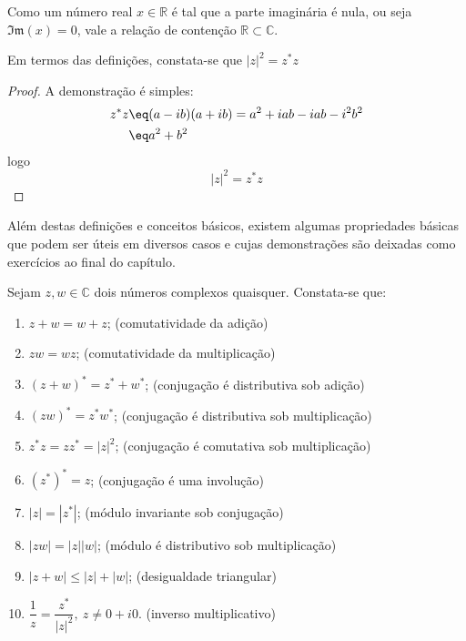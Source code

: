     \begin{corollary}\label{cor: contencao dos reais em C}
        Como um número real $x\in\mathbb{R}$ é tal que a parte imaginária é nula, ou seja $\mathfrak{Im}(x) = 0$, vale a relação de contenção $\mathbb{R}\subset\mathbb{C}$.
    \end{corollary}
    \begin{corollary}\label{cor: modulo}
        Em termos das definições, constata-se que $|z|^2 = z^{\ast}z$
    \end{corollary}
    \begin{proof}
        A demonstração é simples:
            \begin{align*}
                z^{\ast}z &\eq (a-ib)(a+ib) = a^2 + iab - iab - i^2b^2 \\
                &\eq a^2 + b^2
            \end{align*}
        logo
            \begin{equation*}
                |z|^2 = z^{\ast}z
            \end{equation*}
    \end{proof}

Além destas definições e conceitos básicos, existem algumas propriedades básicas que podem ser úteis em diversos casos e cujas demonstrações são deixadas como exercícios ao final do capítulo.
    \begin{properties}
        Sejam $z,w\in\mathbb{C}$ dois números complexos quaisquer. Constata-se que:
        \begin{enumerate}[(1)]
            \item $z+w = w+z$; 
            \hfill (comutatividade da adição)
            \item $zw = wz$; 
            \hfill (comutatividade da multiplicação)
            \item $(z+w)^{\ast} = z^{\ast} + w^{\ast}$; 
            \hfill (conjugação é distributiva sob adição)
            \item $(zw)^{\ast} = z^{\ast}w^{\ast}$; 
            \hfill (conjugação é distributiva sob multiplicação)
            \item $z^{\ast}z = zz^{\ast} = |z|^2$;
            \hfill (conjugação é comutativa sob multiplicação)
            \item $(z^{\ast})^{\ast} = z$;
            \hfill (conjugação é uma involução)
            \item $|z| = |z^{\ast}|$; 
            \hfill (módulo invariante sob conjugação)
            \item $|zw| = |z||w|$; 
            \hfill (módulo é distributivo sob multiplicação)
            \item $|z+w|\leqslant |z| + |w|$; 
            \hfill (desigualdade triangular)
            \item $\dfrac{1}{z} = \dfrac{z^{\ast}}{|z|^2},\ z\neq 0+i0$.
            \hfill (inverso multiplicativo)
        \end{enumerate}
    \end{properties}

    